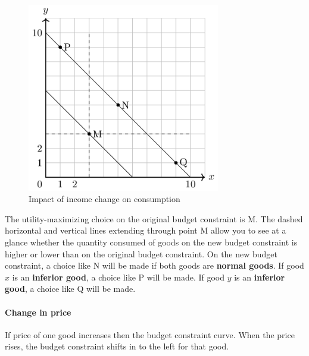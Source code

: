 \documentclass[
  12pt,
  oneside]{book}
\theoremstyle{definition}
\theoremstyle{definition}
\theoremstyle{definition}
\theoremstyle{definition}
\theoremstyle{remark}
\begin{document}
\begin{figure}
\centering
\includegraphics[width=0.75\textwidth,height=\textheight]{fig/incomechange.png}
\caption{\label{fig:incomechange} Impact of income change on consumption}
\end{figure}

The utility-maximizing choice on the original budget constraint is M. The dashed horizontal and vertical lines extending through point M allow you to see at a glance whether the quantity consumed of goods on the new budget constraint is higher or lower than on the original budget constraint. On the new budget constraint, a choice like N will be made if both goods are \textbf{normal goods}. If good \(x\) is an \textbf{inferior good}, a choice like P will be made. If good \(y\) is an \textbf{inferior good}, a choice like Q will be made.

\hypertarget{change-in-price}{%
\paragraph*{Change in price}\label{change-in-price}}

If price of one good increases then the budget constraint curve. When the price rises, the budget constraint shifts in to the left for that good.
\end{document}
